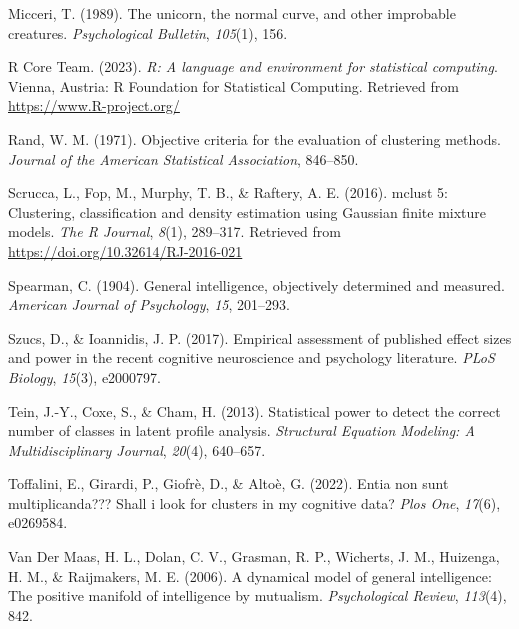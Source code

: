 \documentclass[
  man,floatsintext]{apa6}
\newlength{\cslhangindent}
\newlength{\cslentryspacingunit} %
\newenvironment{CSLReferences}[2] %
 {%
  \setlength{\parindent}{0pt}
  \ifodd #1
  \let\oldpar\par
  \def\par{\hangindent=\cslhangindent\oldpar}
  \fi
  \setlength{\parskip}{#2\cslentryspacingunit}
 }%
 {}
\begin{document}
\begin{CSLReferences}{1}{0}
\leavevmode{}%
Micceri, T. (1989). The unicorn, the normal curve, and other improbable creatures. \emph{Psychological Bulletin}, \emph{105}(1), 156.

\leavevmode{}%
R Core Team. (2023). \emph{R: A language and environment for statistical computing}. Vienna, Austria: R Foundation for Statistical Computing. Retrieved from \url{https://www.R-project.org/}

\leavevmode{}%
Rand, W. M. (1971). Objective criteria for the evaluation of clustering methods. \emph{Journal of the American Statistical Association}, 846--850.

\leavevmode{}%
Scrucca, L., Fop, M., Murphy, T. B., \& Raftery, A. E. (2016). {mclust} 5: Clustering, classification and density estimation using {G}aussian finite mixture models. \emph{The {R} Journal}, \emph{8}(1), 289--317. Retrieved from \url{https://doi.org/10.32614/RJ-2016-021}

\leavevmode{}%
Spearman, C. (1904). General intelligence, objectively determined and measured. \emph{American Journal of Psychology}, \emph{15}, 201--293.

\leavevmode{}%
Szucs, D., \& Ioannidis, J. P. (2017). Empirical assessment of published effect sizes and power in the recent cognitive neuroscience and psychology literature. \emph{PLoS Biology}, \emph{15}(3), e2000797.

\leavevmode{}%
Tein, J.-Y., Coxe, S., \& Cham, H. (2013). Statistical power to detect the correct number of classes in latent profile analysis. \emph{Structural Equation Modeling: A Multidisciplinary Journal}, \emph{20}(4), 640--657.

\leavevmode{}%
Toffalini, E., Girardi, P., Giofrè, D., \& Altoè, G. (2022). Entia non sunt multiplicanda??? Shall i look for clusters in my cognitive data? \emph{Plos One}, \emph{17}(6), e0269584.

\leavevmode{}%
Van Der Maas, H. L., Dolan, C. V., Grasman, R. P., Wicherts, J. M., Huizenga, H. M., \& Raijmakers, M. E. (2006). A dynamical model of general intelligence: The positive manifold of intelligence by mutualism. \emph{Psychological Review}, \emph{113}(4), 842.


\end{CSLReferences}
\end{document}
